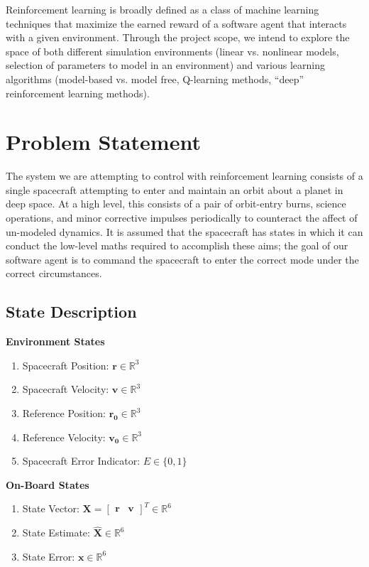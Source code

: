 \documentclass[]{article}
\begin{document}
Reinforcement learning is broadly defined as a class of machine learning techniques that maximize the earned reward of a software agent that interacts with a given environment. Through the project scope, we intend to explore the space of both different simulation environments (linear vs. nonlinear models, selection of parameters to model in an environment) and various learning algorithms (model-based vs. model free, Q-learning methods, ``deep'' reinforcement learning methods). 

\section{Problem Statement}
The system we are attempting to control with reinforcement learning consists of a single spacecraft attempting to enter and maintain an orbit about a planet in deep space. At a high level, this consists of a pair of orbit-entry burns, science operations, and minor corrective impulses periodically to counteract the affect of un-modeled dynamics. It is assumed that the spacecraft has states in which it can conduct the low-level maths required to accomplish these aims; the goal of our software agent is to command the spacecraft to enter the correct mode under the correct circumstances. 

\begin{multicols}{2}
\subsection{State Description}
\textbf{Environment States}

\begin{enumerate}
	\item Spacecraft Position: $\mathbf{r} \in \mathbb{R}^3$
	\item Spacecraft Velocity: $\mathbf{v} \in \mathbb{R}^3$
	\item Reference Position: $\mathbf{r_0} \in \mathbb{R}^3$
	\item Reference Velocity: $\mathbf{v_0} \in \mathbb{R}^3$
	\item Spacecraft Error Indicator: $E \in \{0,1\}$
\end{enumerate}

\textbf{On-Board States}
\begin{enumerate}
	\item State Vector: $\mathbf{X}= \begin{bmatrix} \mathbf{r} &\mathbf{v}\end{bmatrix}^T \in \mathbb{R}^6$
	\item State Estimate: $\mathbf{\hat{X}} \in \mathbb{R}^6$
	\item State Error: $\mathbf{x} \in \mathbb{R}^6$
\end{enumerate}
\end{multicols}
\end{document}
